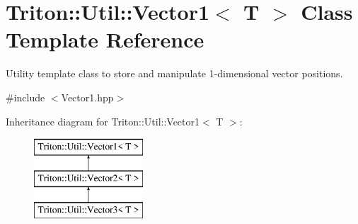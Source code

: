 \hypertarget{class_triton_1_1_util_1_1_vector1}{}\section{Triton\+:\+:Util\+:\+:Vector1$<$ T $>$ Class Template Reference}
\label{class_triton_1_1_util_1_1_vector1}


Utility template class to store and manipulate 1-\/dimensional vector positions.  




{\ttfamily \#include $<$Vector1.\+hpp$>$}

Inheritance diagram for Triton\+:\+:Util\+:\+:Vector1$<$ T $>$\+:\begin{figure}[H]
\begin{center}
\leavevmode
\includegraphics[height=3.000000cm]{class_triton_1_1_util_1_1_vector1}
\end{center}
\end{figure}
